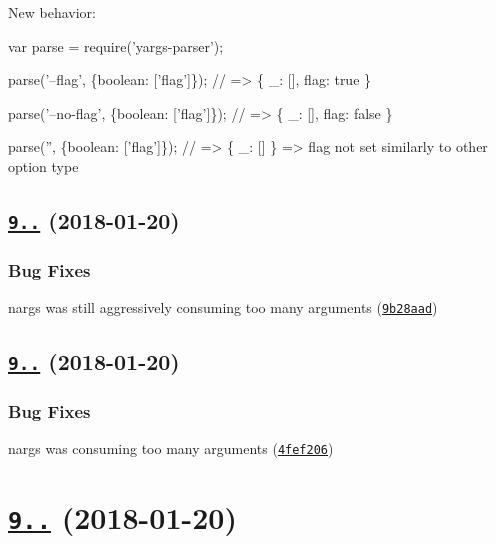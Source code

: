 New behavior\+: 
\begin{DoxyCode}
var parse = require('yargs-parser');

parse('--flag', \{boolean: ['flag']\});
// => \{ \_: [], flag: true \}

parse('--no-flag', \{boolean: ['flag']\});
// => \{ \_: [], flag: false \}

parse('', \{boolean: ['flag']\});
// => \{ \_: [] \} => flag not set similarly to other option type
\end{DoxyCode}


\label{_9.0.2}%
 \subsection*{\href{https://github.com/yargs/yargs-parser/compare/v9.0.1...v9.0.2}{\tt 9..} (2018-\/01-\/20)}

\subsubsection*{Bug Fixes}


\begin{DoxyItemize}
\item nargs was still aggressively consuming too many arguments (\href{https://github.com/yargs/yargs-parser/commit/9b28aad}{\tt 9b28aad})
\end{DoxyItemize}

\label{_9.0.1}%
 \subsection*{\href{https://github.com/yargs/yargs-parser/compare/v9.0.0...v9.0.1}{\tt 9..} (2018-\/01-\/20)}

\subsubsection*{Bug Fixes}


\begin{DoxyItemize}
\item nargs was consuming too many arguments (\href{https://github.com/yargs/yargs-parser/commit/4fef206}{\tt 4fef206})
\end{DoxyItemize}

\label{_9.0.0}%
 \section*{\href{https://github.com/yargs/yargs-parser/compare/v8.1.0...v9.0.0}{\tt 9..} (2018-\/01-\/20)}

